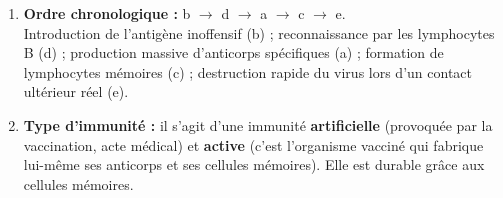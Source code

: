 \documentclass[11pt]{article}
\begin{document}
\begin{corrige}
\begin{enumerate}
\item \textbf{Ordre chronologique :} b $\rightarrow$ d $\rightarrow$ a $\rightarrow$ c $\rightarrow$ e.\\
Introduction de l'antigène inoffensif (b) ; reconnaissance par les lymphocytes B (d) ; production massive d'anticorps spécifiques (a) ; formation de lymphocytes mémoires (c) ; destruction rapide du virus lors d'un contact ultérieur réel (e).
\item \textbf{Type d'immunité :} il s'agit d'une immunité \textbf{artificielle} (provoquée par la vaccination, acte médical) et \textbf{active} (c'est l'organisme vacciné qui fabrique lui-même ses anticorps et ses cellules mémoires). Elle est durable grâce aux cellules mémoires.
\end{enumerate}
\end{corrige}
\end{document}
